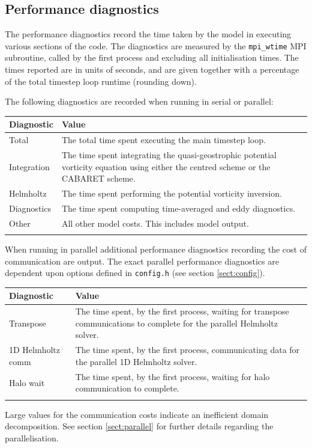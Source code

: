 \documentclass[a4paper]{book}
\begin{document}
\subsection{Performance diagnostics}\label{sect:cost_diagnostics}

The performance diagnostics record the time taken by the model in executing
various sections of the code. The diagnostics are measured by the
\verb+mpi_wtime+ MPI subroutine, called by the first process and excluding all
initialisation times. The times reported are in units of seconds, and are given
together with a percentage of the total timestep loop runtime (rounding down).

The following diagnostics are recorded when running in serial or parallel:
\begin{longtable}{ | p{} | p{} | }
  \hline
  Diagnostic & Value \\
  \hline
  \endhead
  Total       & The total time spent executing the main timestep loop. \\
  Integration & The time spent integrating the quasi-geostrophic potential
                vorticity equation using either the centred scheme or the
                CABARET scheme. \\
  Helmholtz   & The time spent performing the potential vorticity inversion. \\
  Diagnostics & The time spent computing time-averaged and eddy diagnostics. \\
  Other       & All other model costs. This includes model output. \\
  \hline
  \endfoot
\end{longtable}
When running in parallel additional performance diagnostics recording the cost
of communication are output. The exact parallel performance diagnostics are
dependent upon options defined in \verb+config.h+ (see section
\ref{sect:config}).
\begin{longtable}{ | p{} | p{} | }
  \hline
  Diagnostic & Value \\
  \hline
  \endhead
  Transpose         & The time spent, by the first process, waiting for
                      transpose communications to complete for the parallel
                      Helmholtz solver. \\
  1D Helmholtz comm & The time spent, by the first process, communicating data
                      for the parallel 1D Helmholtz solver. \\
  Halo wait         & The time spent, by the first process, waiting for halo
                      communication to complete. \\
  \hline
  \endfoot
\end{longtable}
Large values for the communication costs indicate an inefficient domain
decomposition. See section \ref{sect:parallel} for further details regarding
the parallelisation.
\end{document}
